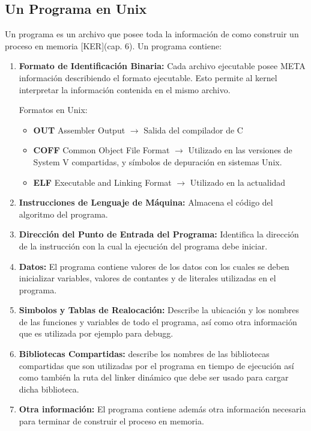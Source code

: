 \documentclass[../main.tex]{subfiles}
\begin{document}
    \subsection{Un Programa en Unix}
        Un programa es un archivo que posee toda la información de como construir un proceso en memoria [KER](cap. 6). Un programa contiene:
        \begin{enumerate}
            \item \textbf{Formato de Identificación Binaria:} Cada archivo ejecutable posee META información describiendo el formato ejecutable. Esto permite al kernel interpretar la información contenida en el mismo archivo.
            
            Formatos en Unix:
            \begin{itemize}
                \item \textbf{OUT} Assembler Output $\rightarrow$ Salida del compilador de C
                \item \textbf{COFF} Common Object File Format $\rightarrow$ Utilizado en las versiones de System V compartidas, y símbolos de depuración en sistemas Unix.
                \item \textbf{ELF} Executable and Linking Format $\rightarrow$ Utilizado en la actualidad
               
            \end{itemize}

            \item \textbf{Instrucciones de Lenguaje de Máquina:} Almacena el código del algoritmo del programa.
            \item \textbf{Dirección del Punto de Entrada del Programa:} Identifica la dirección de la instrucción con la cual la ejecución del programa debe iniciar.
            \item \textbf{Datos:} El programa contiene valores de los datos con los cuales se deben inicializar variables, valores de contantes y de literales utilizadas en el programa.
            \item \textbf{Simbolos y Tablas de Realocación:} Describe la ubicación y los nombres de las funciones y variables de todo el programa, así como otra información que es utilizada por ejemplo para debugg.
            \item \textbf{Bibliotecas Compartidas:} describe los nombres de las bibliotecas compartidas que son utilizadas por el programa en tiempo de ejecución así como también la ruta del linker dinámico que debe ser usado para cargar dicha biblioteca.
            \item \textbf{Otra información:} El programa contiene además otra información necesaria para terminar de construir el proceso en memoria.
        \end{enumerate}
       
\end{document}
